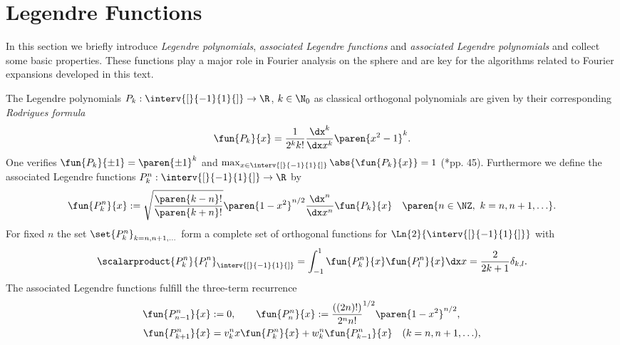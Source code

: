 \section{Legendre Functions}
\label{Basics:LegendreTypeFunctions}
In this section we briefly introduce \emph{Legendre polynomials}, \emph{associated Legendre functions} 
and \emph{associated Legendre polynomials} and collect some basic properties. These functions play 
a major role in Fourier analysis on the sphere and are key for the algorithms related to Fourier 
expansions developed in this text.

The Legendre polynomials $P_k : \interv{[}{-1}{1}{]} \rightarrow \R$, $k \in \N_{0}$ 
as classical orthogonal polynomials are given by their corresponding 
\emph{Rodrigues formula}
\begin{equation}
  \nonumber
  \fun{P_k}{x} = \frac{1}{2^k k!} \frac{\dx^k}{\dx x^k} \paren{x^2-1}^k.
\end{equation}
One verifies $\fun{P_{k}}{\pm1} = \paren{\pm1}^{k}$ and $\max_{x \in \interv{[}{-1}{1}{]}} \abs{\fun{P_{k}}{x}} = 1$ (\cite{niuv}*{pp. 45}).
Furthermore we define the associated Legendre functions $P_k^n : \interv{[}{-1}{1}{]} \rightarrow \R$ by
\begin{equation}
  \nonumber
  \fun{P_k^n}{x} := \sqrt{\frac{\paren{k-n}!}{\paren{k+n}!}}
  \paren{1-x^2}^{n/2} \frac{\dx^n}{\dx x^n} \fun{P_k}{x} \quad \paren{n \in \NZ,\ k=n,n+1,\ldots}.
\end{equation}
For fixed $n$ the set $\set{P_{k}^n}_{k=n,n+1,\ldots}$ form a complete set of orthogonal functions 
for $\Ln{2}{\interv{[}{-1}{1}{]}}$ with
$$ \scalarproduct{P_{k}^n}{P_{l}^n}_{\interv{[}{-1}{1}{]}} = \int_{-1}^{1} \fun{P_{k}^n}{x} \fun{P_{l}^n}{x} \dx x = \frac{2}{2k+1} \delta_{k,l}.$$
The associated Legendre functions fulfill the three-term recurrence
\begin{equation}
  \label{Basics:AssociatedLegendreDefinition}
  \begin{split}
    \fun{P_{n-1}^n}{x} & := 0,\qquad \fun{P_{n}^n}{x} := \frac{((2n)!)}{2^n n!}^{1/2} \paren{1-x^2}^{n/2},\\
    \fun{P_{k+1}^n}{x} & = v_{k}^n x \fun{P_{k}^n}{x} + w_{k}^n \fun{P_{k-1}^n}{x} \quad (k = n,n+1,\ldots),
  \end{split}
\end{equation}
